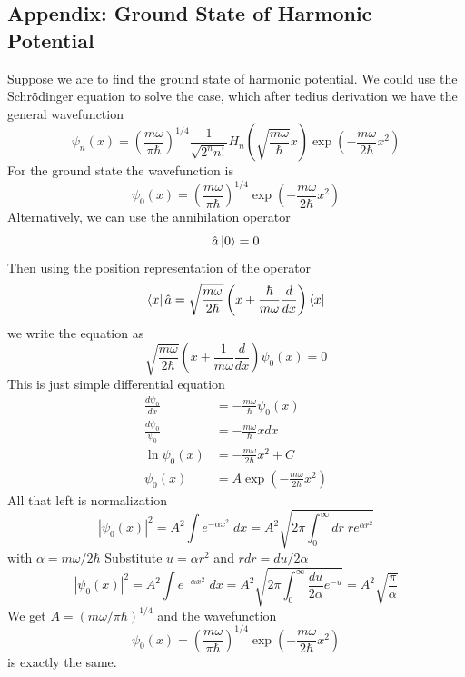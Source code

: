 \documentclass[../../../main.tex]{subfiles}
\begin{document}
\subsection{Appendix: Ground State of Harmonic Potential}
Suppose we are to find the ground state of harmonic potential.
We could use the Schrödinger equation to solve the case, which after tedius derivation we have the general wavefunction
\begin{equation*}
  \psi_{n}(x) = \left(\frac{m\omega}{\pi\hbar}\right)^{1/4} \frac{1}{\sqrt{2^{n} n!}} H_{n}\left(\sqrt{\frac{m\omega}{\hbar}} x\right) \exp \left( -\frac{m\omega }{2\hbar}x^{2} \right)
\end{equation*}
For the ground state the wavefunction is
\begin{equation*}
  \psi_{0}(x) = \left(\frac{m\omega}{\pi\hbar}\right)^{1/4}
  \exp \left( -\frac{m\omega }{2\hbar}x^{2} \right)
\end{equation*}
Alternatively, we can use the annihilation operator
\begin{equation*}
  \hat{a}\ket{0 }=0
\end{equation*}
Then using the position representation of the operator
\begin{equation*}
  \bra{x}\hat{a} = \sqrt{\frac{m \omega}{2 \hbar}} \left( x +  \frac{\hbar }{m \omega} \frac{d }{dx} \right) \bra{x}
\end{equation*}
we write the equation as
\begin{equation*}
  \sqrt{\frac{m \omega}{2 \hbar}} \left(x +  \frac{1}{m \omega} \frac{d }{dx} \right) \psi_0(x)=0
\end{equation*}
This is just simple differential equation
\begin{align*}
  \frac{d\psi_0}{dx}     & =  -\frac{m \omega}{\hbar } \psi_0(x)                \\
  \frac{d\psi_0}{\psi_0} & =  -\frac{m \omega}{\hbar }  x dx                    \\
  \ln \psi_0(x)          & =  -\frac{m \omega}{2 \hbar } x^2 + C                \\
  \psi_0(x)              & =  A \exp\left(-\frac{m \omega}{2 \hbar } x^2\right)
\end{align*}
All that left is normalization
\begin{equation*}
  |\psi_0(x)|^2=A^2\int e^{-\alpha x^2}\;dx = A^2 \sqrt{2\pi \int_{0 }^{\infty} dr\; r e ^{\alpha r^2}}
\end{equation*}
with $\alpha=m\omega/2 \hbar $
Substitute $u = \alpha r^2 $ and $r dr = du/2\alpha $
\begin{equation*}
  |\psi_0(x)|^2=A^2\int e^{-\alpha x^2}\;dx = A^2 \sqrt{2\pi     \int_{0}^{\infty} \frac{du}{2\alpha} e^{-u}}=A^2 \sqrt{\frac{\pi }{\alpha}}
\end{equation*}
We get $A=(m\omega/\pi \hbar ) ^{1/4}$ and the wavefunction
\begin{equation*}
  \psi_{0}(x) = \left(\frac{m\omega}{\pi\hbar}\right)^{1/4}
  \exp \left( -\frac{m\omega }{2\hbar}x^{2} \right)
\end{equation*}
is exactly the same.
\end{document}
